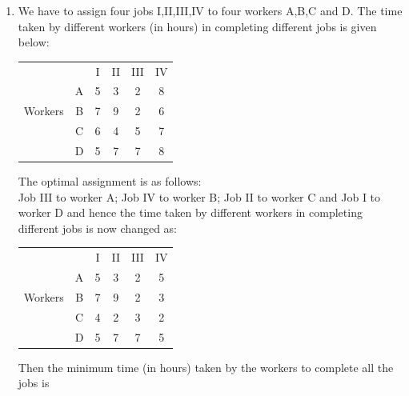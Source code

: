\documentclass[journal,12pt,twocolumn]{IEEEtran}
\begin{document}
\begin{enumerate}
\item We have to assign four jobs I,II,III,IV to four workers A,B,C and D. The time taken by different workers (in hours) in completing different jobs is given below: \\
\begin{table}[!h]
\begin{center}
\begin{tabular}{c c c c c c}
& & I & II & III & IV \\
& A & 5 & 3 & 2 & 8 \\
Workers & B & 7 & 9 & 2 & 6 \\
& C & 6 & 4 & 5 & 7 \\
& D & 5 & 7 & 7 & 8   
\end{tabular}
\end{center}
\end{table}
The optimal assignment is as follows: \\
Job III to worker A; Job IV to worker B; Job II to worker C and Job I to worker D and hence the time taken by different workers in completing different jobs is now changed as: 
\begin{table}[!h]
\begin{center}
\begin{tabular}{c c c c c c}
& & I & II & III & IV \\
& A & 5 & 3 & 2 & 5 \\
Workers & B & 7 & 9 & 2 & 3 \\
& C & 4 & 2 & 3 & 2 \\
& D & 5 & 7 & 7 & 5  
\end{tabular}
\end{center}
\end{table}
Then the minimum time (in hours) taken by the workers to complete all the jobs is 
\begin{enumerate}[(A)]
\end{enumerate}


\end{enumerate}
\end{document}
